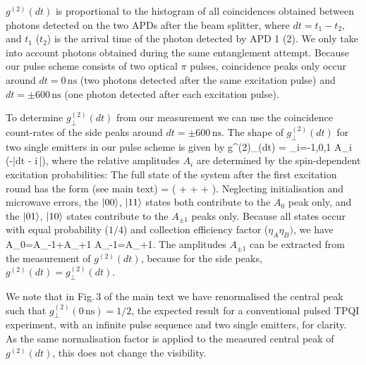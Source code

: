 $g^{(2)}(dt)$ is proportional to the histogram of all coincidences obtained between photons detected on the two APDs after the beam splitter, where $dt = t_1 - t_2$, and $t_1$ ($t_2$) is the arrival time of the photon detected by APD 1 (2). We only take into account photons obtained during the same entanglement attempt. Because our pulse scheme consists of two optical $\pi$ pulses, coincidence peaks only occur around $dt = 0\,\text{ns}$ (two photons detected after the same excitation pulse) and $dt = \pm 600\,\text{ns}$ (one photon detected after each excitation pulse). 

To determine $g^{(2)}_\perp(dt)$ from our measurement we can use the coincidence count-rates of the side peaks around $dt = \pm 600\,\text{ns}$. The shape of $g^{(2)}_\perp(dt)$ for two single emitters in our pulse scheme is given by
\be
g^{(2)}_\perp(dt) = \sum_{i=-1,0,1} A_i \exp (-\Gamma |dt - i\,|),
\ee
where the relative amplitudes $A_i$ are determined by the spin-dependent excitation probabilities: The full state of the system after the first excitation round has the form (see main text)
\be
	\ket{\psi} =  \left ( \ket{\uparrow\uparrow} +  \ket{\downarrow\downarrow} + \ket{\uparrow\downarrow} + \ket{\downarrow\uparrow} \right ).
\ee
Neglecting initialisation and microwave errors, the $\left|00\right>$, $\left|11\right>$ states both contribute to the $A_0$ peak only, and the $\left|01\right>$, $\left|10\right>$ states contribute to the $A_{\pm 1}$ peaks only. Because all states occur with equal probability ($1/4$) and collection efficiency factor ($\eta_A\eta_B)$, we have 
\be
A_0=A_{-1}+A_{+1} A_{-1}=A_{+1}.
\ee
The amplitudes $A_{\pm 1}$ can be extracted from the measurement of $g^{(2)}(dt)$, because for the side peaks, $g^{(2)}(dt) = g^{(2)}_\perp(dt)$. %

We note that in Fig.\,3 of the main text we have renormalised the central peak such that $g^{(2)}_\perp(0\,\text{ns}) = 1/2$, the expected result for a conventional pulsed TPQI experiment, with an infinite pulse sequence and two single emitters, for clarity. As the same normalisation factor is applied to the measured central peak of $g^{(2)}(dt)$, this does not change the visibility.%


